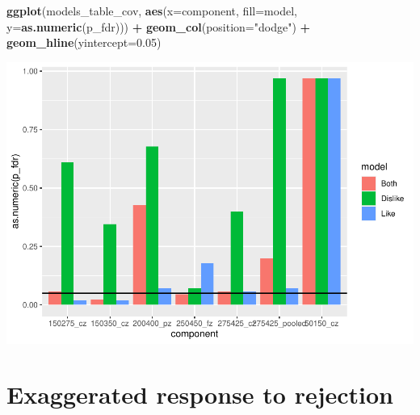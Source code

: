 \documentclass[
]{article}
\newenvironment{Shaded}{\begin{snugshade}}{\end{snugshade}}
\newcommand{\AttributeTok}[1]{\textcolor[rgb]{0.13,0.29,0.53}{#1}}
\newcommand{\FloatTok}[1]{\textcolor[rgb]{0.00,0.00,0.81}{#1}}
\newcommand{\FunctionTok}[1]{\textcolor[rgb]{0.13,0.29,0.53}{\textbf{#1}}}
\newcommand{\NormalTok}[1]{#1}
\newcommand{\SpecialCharTok}[1]{\textcolor[rgb]{0.81,0.36,0.00}{\textbf{#1}}}
\newcommand{\StringTok}[1]{\textcolor[rgb]{0.31,0.60,0.02}{#1}}
\begin{document}
\begin{Shaded}
\begin{Highlighting}[]
\FunctionTok{ggplot}\NormalTok{(models\_table\_cov, }\FunctionTok{aes}\NormalTok{(}\AttributeTok{x=}\NormalTok{component, }\AttributeTok{fill=}\NormalTok{model, }\AttributeTok{y=}\FunctionTok{as.numeric}\NormalTok{(p\_fdr))) }\SpecialCharTok{+}
  \FunctionTok{geom\_col}\NormalTok{(}\AttributeTok{position=}\StringTok{"dodge"}\NormalTok{) }\SpecialCharTok{+}
  \FunctionTok{geom\_hline}\NormalTok{(}\AttributeTok{yintercept=}\FloatTok{0.05}\NormalTok{)}
\end{Highlighting}
\end{Shaded}

\includegraphics{do01_BUDS_files/figure-latex/unnamed-chunk-25-2.pdf}

\hypertarget{exaggerated-response-to-rejection}{%
\section{Exaggerated response to
rejection}\label{exaggerated-response-to-rejection}}
\end{document}
